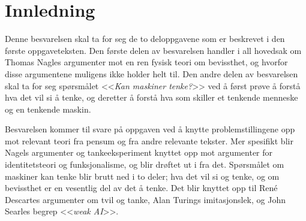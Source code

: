 \section{Innledning}

Denne besvarelsen skal ta for seg de to deloppgavene som er beskrevet i den første oppgaveteksten. 
Den første delen av besvarelsen handler i all hovedsak om Thomas Nagles argumenter mot en ren fysisk teori om bevissthet, og hvorfor disse argumentene muligens ikke holder helt til.
Den andre delen av besvarelsen skal ta for seg spørsmålet <<\textit{Kan maskiner tenke?}>> ved å først prøve å forstå hva det vil si å tenke, og deretter å forstå hva som skiller et tenkende menneske og en tenkende maskin. 

Besvarelsen kommer til svare på oppgaven ved å knytte problemstillingene opp mot relevant teori fra pensum og fra andre relevante tekster. Mer spesifikt blir Nagels argumenter og tankeeksperiment knyttet opp mot argumenter for identitetsteori og funksjonalisme, og blir drøftet ut i fra det. Spørsmålet om maskiner kan tenke blir brutt ned i to deler; hva det vil si og tenke, og om bevissthet er en vesentlig del av det å tenke. Det blir knyttet opp til René Descartes argumenter om tvil og tanke, Alan Turings imitasjonslek, og John Searles begrep <<\textit{weak AI}>>.